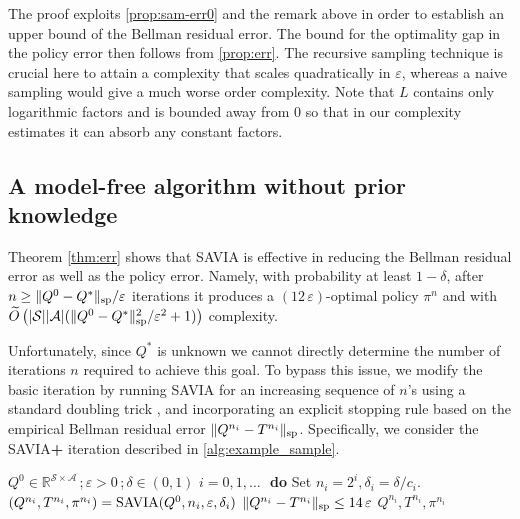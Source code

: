 \documentclass{article}
\newcommand{\cA}{\mathcal{A}}
\newcommand{\cS}{\mathcal{S}}
\newcommand{\real}{\mathbb{R}}
\renewcommand{\sp}[1]{\|{#1}\|_\text{\rm sp}}
\theoremstyle{plain}
\theoremstyle{definition}
\theoremstyle{remark}
\begin{document}
The proof exploits \cref{prop:sam-err0} and the remark above in order to  establish an upper bound of the Bellman residual error. The bound for the optimality gap in the policy error then follows from  \cref{prop:err}. The recursive sampling technique is crucial here to attain a complexity that scales quadratically in $\varepsilon$,
whereas a naive sampling would give a much worse order complexity. 
Note that $L$ contains only logarithmic factors and is bounded away from 0 so that in our complexity estimates it can absorb any constant factors. 


\subsection{A model-free algorithm without prior knowledge}\label{Se:complexity2}
Theorem \ref{thm:err} shows that \mbox{\rm SAVIA}  is  effective in reducing the Bellman residual error as well as the policy error. Namely,
with probability at least $1-\delta$, after $n\geq \sp{Q^0-Q^*}/\varepsilon$ iterations  it produces a $(12\,\varepsilon)$-optimal policy  $\pi^n$  and with $\widetilde{O}\left({|\cS||\cA|(\sp{Q^0-Q^*}^{2}}/{\varepsilon^{2}}+1)\right)$   complexity. 

Unfortunately, since $Q^*$ is unknown we cannot directly  determine the number of iterations $n$ required
to achieve this goal. To bypass this issue, we modify the basic iteration by running {\rm SAVIA} for an increasing sequence of $n$'s using a standard doubling trick \citep{ auer1995gambling, besson2018doubling}, and incorporating an explicit stopping rule
based on the empirical Bellman residual error $\sp{Q^{n_i}-T^{n_i}}$. Specifically, we consider the \mbox{\rm SAVIA\textbf{+}} iteration described in \cref{alg:example_sample}.
\begin{algorithm}[ht!]
  \caption{\mbox{\sc \mbox{\rm SAVIA\textbf{+}}}$(Q^0,\varepsilon,\delta)$}
  \label{alg:example_sample}
\begin{algorithmic}
   $Q^{0}\!\in\real^{\cS\times\cA}$\,;\,$\varepsilon>0$\,;\,$\delta\in(0,1)$
   $i=0,1,\dots$ \,\,\textbf{do} 
    \STATE \quad Set $n_i= 2^i,  \delta_i = \delta/c_i $. 
    \STATE \quad  $(Q^{n_i},T^{n_i}, \pi^{n_i} ) = \mbox{\sc \mbox{\rm SAVIA}}(Q^0,n_i,\varepsilon,\delta_i)$
      $\sp{Q^{n_i}-T^{n_i}}\leq 14\,\varepsilon$
 $Q^{n_i},T^{n_i}, \pi^{n_i}$
\end{algorithmic}
\end{algorithm}
\end{document}
